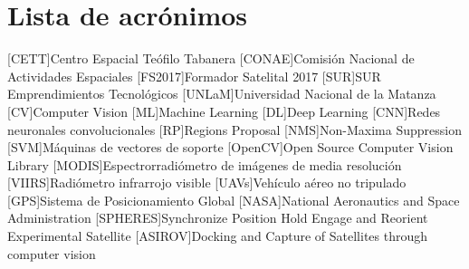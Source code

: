 \chapter*{Lista de acrónimos}
\label{chap:acronimos}

\begin{acronym}
[CETT]{Centro Espacial Teófilo Tabanera}
[CONAE]{Comisión Nacional de Actividades Espaciales}
[FS2017]{Formador Satelital 2017}
[SUR]{SUR Emprendimientos Tecnológicos}
[UNLaM]{Universidad Nacional de la Matanza}
[CV]{Computer Vision}
[ML]{Machine Learning}
[DL]{Deep Learning}
[CNN]{Redes neuronales convolucionales}
[RP]{Regions Proposal}
[NMS]{Non-Maxima Suppression}
[SVM]{Máquinas de vectores de soporte}
[OpenCV]{Open Source Computer Vision Library}
[MODIS]{Espectrorradiómetro de imágenes de media resolución}
[VIIRS]{Radiómetro infrarrojo visible}
[UAVs]{Vehículo aéreo no tripulado}
[GPS]{Sistema de Posicionamiento Global}
[NASA]{National Aeronautics and Space Administration}
[SPHERES]{Synchronize Position Hold Engage and Reorient Experimental Satellite}
 [ASIROV]{Docking and Capture of Satellites through computer vision}
\end{acronym}


